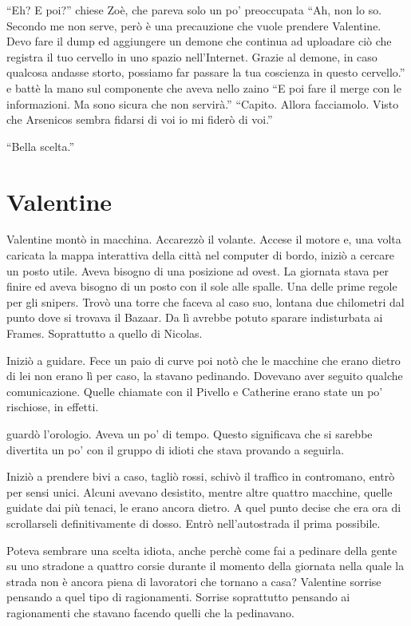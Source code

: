     ``Eh? E poi?'' chiese Zoè, che pareva solo un po' preoccupata ``Ah, non lo so. Secondo me non serve, però è una
    precauzione che vuole prendere Valentine. Devo fare il dump ed aggiungere un demone che continua ad uploadare ciò
    che registra il tuo cervello in uno spazio nell'Internet. Grazie al demone, in caso qualcosa andasse storto,
    possiamo far passare la tua coscienza in questo cervello.'' e battè la mano sul componente che aveva nello zaino ``E
    poi fare il merge con le informazioni. Ma sono sicura che non servirà.'' ``Capito. Allora facciamolo. Visto che
    Arsenicos sembra fidarsi di voi io mi fiderò di voi.''

    ``Bella scelta.''

  \section*{Valentine}
    
    Valentine montò in macchina. Accarezzò il volante. Accese il motore e, una volta caricata la mappa interattiva della
    città nel computer di bordo, iniziò a cercare un posto utile. Aveva bisogno di una posizione ad ovest. La giornata
    stava per finire ed aveva bisogno di un posto con il sole alle spalle. Una delle prime regole per gli snipers. Trovò
    una torre che faceva al caso suo, lontana due chilometri dal punto dove si trovava il Bazaar. Da lì avrebbe potuto
    sparare indisturbata ai Frames. Soprattutto a quello di Nicolas.

    Iniziò a guidare. Fece un paio di curve poi notò che le macchine che erano dietro di lei non erano lì per caso, la
    stavano pedinando. Dovevano aver seguito qualche comunicazione. Quelle chiamate con il Pivello e Catherine erano
    state un po' rischiose, in effetti.

    guardò l'orologio. Aveva un po' di tempo. Questo significava che si sarebbe divertita un po' con il gruppo di idioti
    che stava provando a seguirla.

    Iniziò a prendere bivi a caso, tagliò rossi, schivò il traffico in contromano, entrò per sensi unici. Alcuni avevano
    desistito, mentre altre quattro macchine, quelle guidate dai più tenaci, le erano ancora dietro. A quel punto decise
    che era ora di scrollarseli definitivamente di dosso. Entrò nell'autostrada il prima possibile.

    Poteva sembrare una scelta idiota, anche perchè come fai a pedinare della gente su uno stradone a quattro corsie
    durante il momento della giornata nella quale la strada non è ancora piena di lavoratori che tornano a casa?
    Valentine sorrise pensando a quel tipo di ragionamenti. Sorrise soprattutto pensando ai ragionamenti che stavano
    facendo quelli che la pedinavano.

